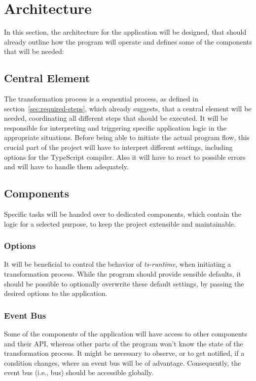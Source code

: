 \section{Architecture}
\label{sec:architecture}

In this section, the architecture for the application will be designed, that should already outline how the program will operate and defines some of the components that will be needed:

\subsection{Central Element}

The transformation process is a sequential process, as defined in section~\ref{sec:required-steps}, which already suggests, that a central element will be needed, coordinating all different steps that should be executed. It will be responsible for interpreting and triggering specific application logic in the appropriate situations. Before being able to initiate the actual program flow, this crucial part of the project will have to interpret different settings, including options for the TypeScript compiler. Also it will have to react to possible errors and will have to handle them adequately.

\subsection{Components}

Specific tasks will be handed over to dedicated components, which contain the logic for a selected purpose, to keep the project extensible and maintainable.

\subsubsection{Options}

It will be beneficial to control the behavior of \emph{ts-runtime}, when initiating a transformation process. While the program should provide sensible defaults, it should be possible to optionally overwrite these default settings, by passing the desired options to the application.

\subsubsection{Event Bus}

Some of the components of the application will have access to other components and their API, whereas other parts of the program won't know the state of the transformation process. It might be necessary to observe, or to get notified, if a condition changes, where an event bus will be of advantage. Consequently, the event bus (i.e., bus) should be accessible globally. 

